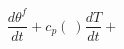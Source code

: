 \begin{equation}
[(h^f-h^g) + (T- T_{ref}) (c_p^f-c_p^g) ]\frac{d\theta^f }{dt} + c_p(\ ) \frac{d T}{dt} +   
\end{equation}